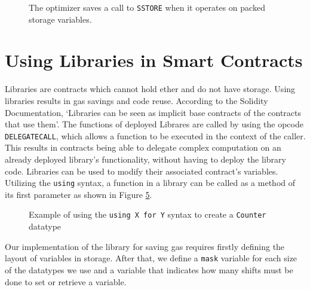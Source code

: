 \begin{figure}[htb]
  \begin{subfigure}[b]{\textwidth}
    \centering
    
    \label{fig:optimizer:a}
  \end{subfigure}

  \begin{subfigure}[b]{\textwidth}
    \centering
    
    \label{fig:optimizer:b}
  \end{subfigure}

  \begin{subfigure}[b]{\textwidth}
    \centering
    
    \label{fig:optimizer:c}
  \end{subfigure}

  \caption{The optimizer saves a call to \texttt{SSTORE} when it operates on packed storage variables.} 
  \label{fig:optimizer}
\end{figure}

\section{Using Libraries in Smart Contracts}

Libraries are contracts which cannot hold ether and do not have storage. Using libraries results in gas savings and code reuse. According to the Solidity Documentation, `Libraries can be seen as implicit base contracts of the contracts that use them'. The functions of deployed Librares are called by using the opcode \texttt{DELEGATECALL}, which allows a function to be executed in the context of the caller. This results in contracts being able to delegate complex computation on an already deployed library's functionality, without having to deploy the library code. Libraries can be used to modify their associated contract's variables. Utilizing the \texttt{using} syntax, a function in a library can be called as a method of its first parameter as shown in Figure \ref{fig:usingfor}.

\begin{figure}[htb]
    \centering
    
    \caption{Example of using the \texttt{using X for Y} syntax to create a \texttt{Counter} datatype~\cite{library}}
    \label{fig:usingfor}
\end{figure}

Our implementation of the library for saving gas requires firstly defining the layout of variables in storage. After that, we define a \texttt{mask} variable for each size of the datatypes we use and a variable that indicates how many shifts must be done to set or retrieve a variable. 

